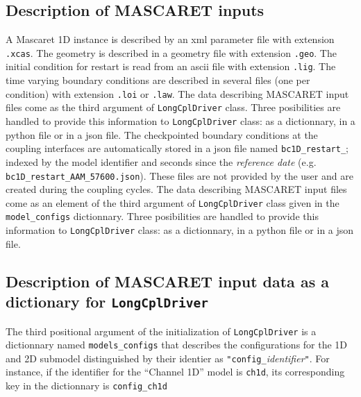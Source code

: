 \documentclass[Coupling]{../../data/TelemacDoc} %
\begin{document}
\subsection{Description of MASCARET inputs}
A Mascaret 1D instance is described by an xml parameter file
with extension \texttt{.xcas}. The geometry is described
in a geometry file with extension \texttt{.geo}.  
The initial condition for restart is read from an ascii file with extension \texttt{.lig}.
The time varying boundary conditions are described in several
files (one per condition) with extension \texttt{.loi} or \texttt{.law}. The data describing MASCARET input files come as the third argument of \texttt{LongCplDriver} class.  Three posibilities are handled to provide this information to \texttt{LongCplDriver} class: as a dictionnary, in a python file or in a json file.  The checkpointed boundary conditions at the
coupling interfaces are automatically stored in a json file named 
\texttt{bc1D\_restart\_}; indexed by the  model identifier
and seconds since the {\em reference
  date} (e.g. \texttt{bc1D\_restart\_AAM\_57600.json}). These files are 
not provided by the user and are created during the coupling cycles. 
The data describing MASCARET input files come as an element of the third argument of \texttt{LongCplDriver} class given in the \texttt{model\_configs} dictionnary.  Three posibilities are handled to provide this information to \texttt{LongCplDriver} class: as a dictionnary, in a python file or in a json file. 

\subsection{Description of MASCARET input data as a dictionary for \texttt{LongCplDriver}}
The third positional argument of the initialization of
\texttt{LongCplDriver} is a dictionnary named \texttt{models\_configs} that describes the configurations for the 1D and 2D submodel distinguished by their identier as \texttt{"config\_}{\em identifier}\texttt{"}. For instance, if the identifier for the ``Channel 1D'' model is
\texttt{ch1d}, its corresponding key in the dictionnary is \texttt{config\_ch1d}
\newline
\end{document}
